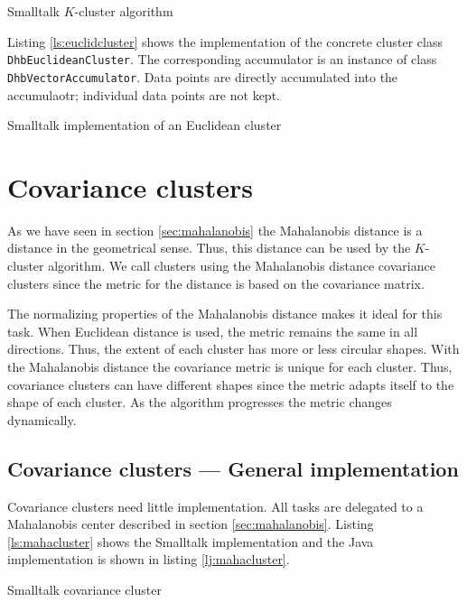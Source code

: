 \documentclass[twoside]{book}
\begin{document}
\begin{listing} Smalltalk $K$-cluster algorithm \label{ls:clusterfinder}


\end{listing}
Listing \ref{ls:euclidcluster} shows the implementation of the
concrete cluster class {\tt DhbEuclideanCluster}. The
corresponding accumulator is an instance of class {\tt
DhbVectorAccumulator}. Data points are directly accumulated into
the accumulaotr; individual data points are not kept.
\begin{listing} Smalltalk implementation of an Euclidean cluster \label{ls:euclidcluster}

\end{listing}


\section{Covariance clusters}
\label{sec:mahalanobiscluster} As we have seen in section
\ref{sec:mahalanobis} the Mahalanobis distance is a distance in
the geometrical sense. Thus, this distance can be used by the
$K$-cluster algorithm. We call clusters using the Mahalanobis
distance covariance clusters since the metric for the distance is
based on the covariance matrix.

The normalizing properties of the Mahalanobis distance makes it
ideal for this task. When Euclidean distance is used, the metric
remains the same in all directions. Thus, the extent of each
cluster has more or less circular shapes. With the Mahalanobis
distance the covariance metric is unique for each cluster. Thus,
covariance clusters can have different shapes since the metric
adapts itself to the shape of each cluster. As the algorithm
progresses the metric changes dynamically.

\subsection{Covariance clusters --- General implementation}
 Covariance clusters need little
implementation. All tasks are delegated to a Mahalanobis center
described in section \ref{sec:mahalanobis}. Listing
\ref{ls:mahacluster} shows the Smalltalk implementation and the
Java implementation is shown in listing \ref{lj:mahacluster}.

\begin{listing} Smalltalk covariance cluster \label{ls:mahacluster}

\end{listing}


\ifx\wholebook\relax\else
\end{document}
